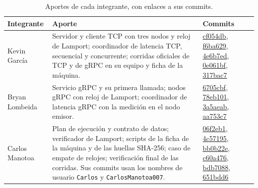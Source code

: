 \documentclass[11pt,a4paper]{article}
\begin{document}
\begin{table}[htbp]
  \centering
  \caption{Aportes de cada integrante, con enlaces a sus commits.}
  \label{tab:aportes}
  \small
  \begin{tabular}{@{}>{\raggedright\arraybackslash}p{2.3cm}>{\raggedright\arraybackslash}p{6.4cm}>{\raggedright\arraybackslash}p{6.1cm}@{}}
    \toprule
    Integrante & Aporte & Commits \\
    \midrule
    Kevin García & Servidor y cliente TCP con tres nodos y reloj de Lamport; coordinador de
    latencia TCP, secuencial y concurrente; corridas oficiales de TCP y de gRPC en su equipo y
    ficha de la máquina. & \href{https://github.com/yaser-uwu/GA-SUM-02-PE-U1/commit/cf054dbe1514ecb9ed4cca748df664ab768fbe3f}{cf054db}, \href{https://github.com/yaser-uwu/GA-SUM-02-PE-U1/commit/f6ba6298c776a2741d3943cf5ebf356f4c8a29d2}{f6ba629}, \href{https://github.com/yaser-uwu/GA-SUM-02-PE-U1/commit/4e6b7eda37f82c66454391ac48b8a40500309d5d}{4e6b7ed}, \href{https://github.com/yaser-uwu/GA-SUM-02-PE-U1/commit/0e061bfe15139e5cf4c890ad9c566292b2bcb4d8}{0e061bf}, \href{https://github.com/yaser-uwu/GA-SUM-02-PE-U1/commit/317bac747d4be88534343a2b0f0b084bbd8b110c}{317bac7} \\
    Bryan Lombeida & Servicio gRPC y su primera llamada; nodos gRPC con reloj de Lamport;
    coordinador de latencia gRPC con la medición en el nodo emisor. & \href{https://github.com/yaser-uwu/GA-SUM-02-PE-U1/commit/6705cbf04cd83086a98db6962b18acc5b0de4a79}{6705cbf}, \href{https://github.com/yaser-uwu/GA-SUM-02-PE-U1/commit/78eb10187eb421204af59c7ccbd2b183c1db05e7}{78eb101}, \href{https://github.com/yaser-uwu/GA-SUM-02-PE-U1/commit/3a5aeab3c2b2326869ff914780b5dc8cc54dc4cc}{3a5aeab}, \href{https://github.com/yaser-uwu/GA-SUM-02-PE-U1/commit/aa753c7861479c3a896e64912febb2d96e0e1885}{aa753c7} \\
    Carlos Manotoa & Plan de ejecución y contrato de datos; verificador de Lamport; scripts de la
    ficha de la máquina y de las huellas SHA-256; caso de empate de relojes; verificación final
    de las corridas. Sus commits usan los nombres de usuario \texttt{Carlos} y
    \texttt{CarlosManotoa007}. & \href{https://github.com/yaser-uwu/GA-SUM-02-PE-U1/commit/06f2eb1288e966d8d3255b9eb33ec3caaa2a21e9}{06f2eb1}, \href{https://github.com/yaser-uwu/GA-SUM-02-PE-U1/commit/4c57195c21ca2c86f63f1ad8741c454218b01a56}{4c57195}, \href{https://github.com/yaser-uwu/GA-SUM-02-PE-U1/commit/bb0b22e2e347f14b04aa1606878a6aa1aab402fa}{bb0b22e}, \href{https://github.com/yaser-uwu/GA-SUM-02-PE-U1/commit/c60a4762844dc87c62154c22659e271d2adc741d}{c60a476}, \href{https://github.com/yaser-uwu/GA-SUM-02-PE-U1/commit/bdb7088ec9117c49dd37eb42b564f5c28e11e2e9}{bdb7088}, \href{https://github.com/yaser-uwu/GA-SUM-02-PE-U1/commit/651bdd6b3190bf61cbf4ef21bd52c0bfa09bfee8}{651bdd6} \\

\end{tabular}
\end{table}
\end{document}
